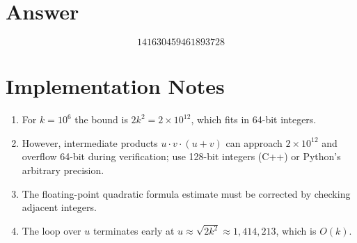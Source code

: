 \documentclass[11pt,a4paper]{article}
\begin{document}
\section{Answer}

\[
\boxed{141630459461893728}
\]
\section{Implementation Notes}

\begin{enumerate}[nosep]
\item For $k = 10^6$ the bound is $2k^2 = 2 \times 10^{12}$, which fits in 64-bit integers.
\item However, intermediate products $u \cdot v \cdot (u+v)$ can approach $2 \times 10^{12}$ and overflow 64-bit during verification; use 128-bit integers (C++) or Python's arbitrary precision.
\item The floating-point quadratic formula estimate must be corrected by checking adjacent integers.
\item The loop over $u$ terminates early at $u \approx \sqrt{2k^2} \approx 1{,}414{,}213$, which is $O(k)$.
\end{enumerate}
\end{document}
